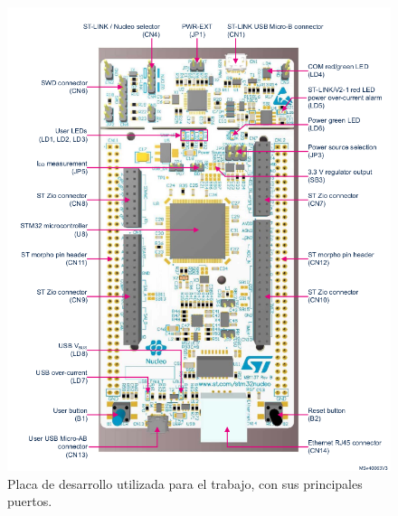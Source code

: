 \begin{figure}
	\centering
	\includegraphics[width=1\linewidth]{Figures/placanucleoF429ZI}
	\caption{Placa de desarrollo utilizada para el  trabajo, con sus principales puertos. %
	}
	\label{fig:placanucleof429zi}
\end{figure}


\begin{table}[h!]
	\centering
	
	\caption{Especificaciones técnicas del sensor DHT22. %
	}
	\small
	
	\label{tab:dht22_specs}
\end{table}






